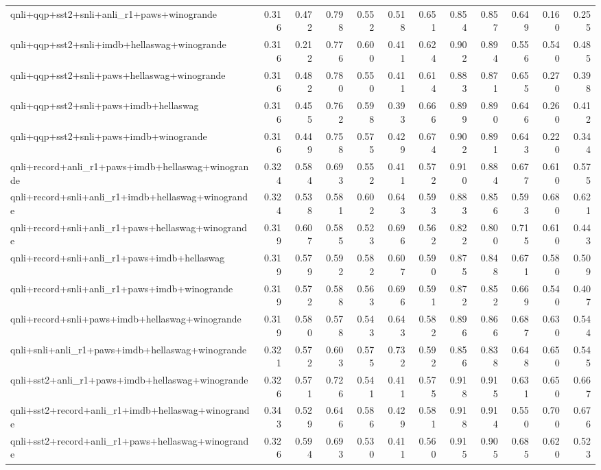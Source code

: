 \begin{table}[t]
\begin{tabular}{lrrrrrrrrrrr}
    qnli+qqp+sst2+snli+anli\_r1+paws+winogrande & 0.316 & 0.472 & 0.798 & 0.552 & 0.518 & 0.651 & 0.854 & 0.857 & 0.649 & 0.160 & 0.255 \\
    qnli+qqp+sst2+snli+imdb+hellaswag+winogrande & 0.316 & 0.212 & 0.776 & 0.600 & 0.411 & 0.624 & 0.902 & 0.894 & 0.556 & 0.540 & 0.485 \\
    qnli+qqp+sst2+snli+paws+hellaswag+winogrande & 0.316 & 0.482 & 0.780 & 0.550 & 0.411 & 0.614 & 0.883 & 0.871 & 0.655 & 0.270 & 0.398 \\
    qnli+qqp+sst2+snli+paws+imdb+hellaswag & 0.316 & 0.455 & 0.762 & 0.598 & 0.393 & 0.666 & 0.899 & 0.890 & 0.646 & 0.260 & 0.412 \\
    qnli+qqp+sst2+snli+paws+imdb+winogrande & 0.316 & 0.449 & 0.758 & 0.575 & 0.429 & 0.674 & 0.902 & 0.891 & 0.643 & 0.220 & 0.344 \\
    qnli+record+anli\_r1+paws+imdb+hellaswag+winogrande & 0.324 & 0.584 & 0.693 & 0.552 & 0.411 & 0.572 & 0.910 & 0.884 & 0.677 & 0.610 & 0.575 \\
    qnli+record+snli+anli\_r1+imdb+hellaswag+winogrande & 0.324 & 0.538 & 0.581 & 0.602 & 0.643 & 0.593 & 0.883 & 0.856 & 0.593 & 0.680 & 0.621 \\
    qnli+record+snli+anli\_r1+paws+hellaswag+winogrande & 0.319 & 0.607 & 0.585 & 0.523 & 0.696 & 0.562 & 0.822 & 0.800 & 0.715 & 0.610 & 0.443 \\
    qnli+record+snli+anli\_r1+paws+imdb+hellaswag & 0.319 & 0.579 & 0.592 & 0.582 & 0.607 & 0.590 & 0.875 & 0.848 & 0.671 & 0.580 & 0.509 \\
    qnli+record+snli+anli\_r1+paws+imdb+winogrande & 0.319 & 0.572 & 0.588 & 0.563 & 0.696 & 0.591 & 0.872 & 0.852 & 0.669 & 0.540 & 0.407 \\
    qnli+record+snli+paws+imdb+hellaswag+winogrande & 0.319 & 0.580 & 0.578 & 0.543 & 0.643 & 0.582 & 0.896 & 0.866 & 0.687 & 0.630 & 0.544 \\
    qnli+snli+anli\_r1+paws+imdb+hellaswag+winogrande & 0.321 & 0.572 & 0.603 & 0.575 & 0.732 & 0.592 & 0.856 & 0.838 & 0.648 & 0.650 & 0.545 \\
    qnli+sst2+anli\_r1+paws+imdb+hellaswag+winogrande & 0.326 & 0.571 & 0.726 & 0.541 & 0.411 & 0.575 & 0.918 & 0.915 & 0.631 & 0.650 & 0.667 \\
    qnli+sst2+record+anli\_r1+imdb+hellaswag+winogrande & 0.343 & 0.529 & 0.646 & 0.586 & 0.429 & 0.581 & 0.918 & 0.914 & 0.550 & 0.700 & 0.676 \\
    qnli+sst2+record+anli\_r1+paws+hellaswag+winogrande & 0.326 & 0.594 & 0.693 & 0.530 & 0.411 & 0.560 & 0.915 & 0.905 & 0.685 & 0.620 & 0.523 \\

\end{tabular}
\end{table}
